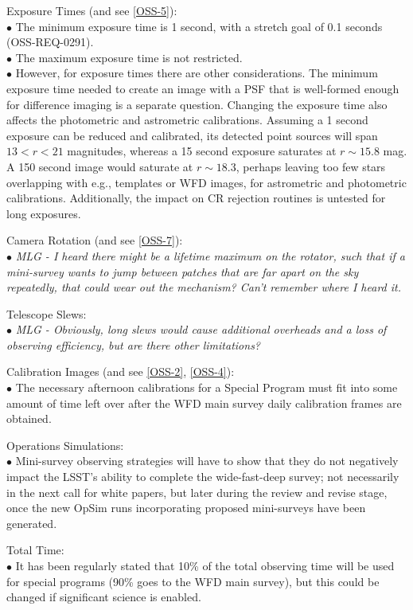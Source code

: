 \documentclass[DM,lsstdraft,toc]{lsstdoc}
\begin{document}
Exposure Times (and see \ref{OSS-5}): \\
$\bullet$ The minimum exposure time is 1 second, with a stretch goal of 0.1 seconds (OSS-REQ-0291). \\
$\bullet$ The maximum exposure time is not restricted. \\
$\bullet$ However, for exposure times there are other considerations. The minimum exposure time needed to create an image with a PSF that is well-formed enough for difference imaging is a separate question. Changing the exposure time also affects the photometric and astrometric calibrations. Assuming a 1 second exposure can be reduced and calibrated, its detected point sources will span $13 < r < 21$ magnitudes, whereas a 15 second exposure saturates at $r\sim15.8$ mag. A 150 second image would saturate at $r\sim18.3$, perhaps leaving too few stars overlapping with e.g., templates or WFD images, for astrometric and photometric calibrations. Additionally, the impact on CR rejection routines is untested for long exposures. 

Camera Rotation (and see \ref{OSS-7}): \\
$\bullet$ \textit{MLG - I heard there might be a lifetime maximum on the rotator, such that if a mini-survey wants to jump between patches that are far apart on the sky repeatedly, that could wear out the mechanism? Can't remember where I heard it.}

Telescope Slews: \\
$\bullet$ \textit{MLG - Obviously, long slews would cause additional overheads and a loss of observing efficiency, but are there other limitations?}

Calibration Images (and see \ref{OSS-2}, \ref{OSS-4}): \\
$\bullet$ The necessary afternoon calibrations for a Special Program must fit into some amount of time left over after the WFD main survey daily calibration frames are obtained.

Operations Simulations: \\
$\bullet$ Mini-survey observing strategies will have to show that they do not negatively impact the LSST's ability to complete the wide-fast-deep survey; not necessarily in the next call for white papers, but later during the review and revise stage, once the new OpSim runs incorporating proposed mini-surveys have been generated.

Total Time: \\
$\bullet$ It has been regularly stated that 10\% of the total observing time will be used for special programs (90\% goes to the WFD main survey), but this could be changed if significant science is enabled. \\
\end{document}
